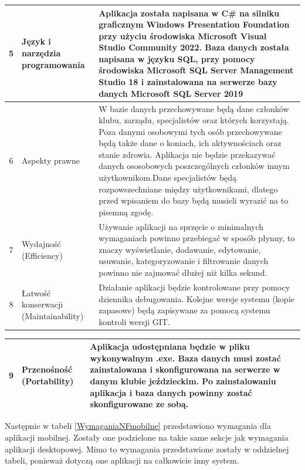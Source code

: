 \documentclass[12pt,oneside]{report}
\begin{document}
\begin{table}[H]
	\begin{tabular}{|c|p{6cm}|p{8cm}|}
		\hline
		5& Język i narzędzia programowania& Aplikacja została napisana w C\# na silniku graficznym Windows Presentation Foundation przy użyciu środowiska  Microsoft Visual Studio Community 2022.
		Baza danych została napisana w języku SQL, przy pomocy środowiska Microsoft SQL Server Management Studio 18 i zainstalowana na serwerze bazy danych Microsoft SQL Server 2019\\	

					\hline
		6& Aspekty prawne& W bazie danych przechowywane będą dane członków klubu, zarządu, specjalistów oraz których korzystają. Poza danymi osobowymi tych osób przechowywane będą także dane o koniach, ich aktywnościach oraz stanie zdrowia. Aplikacja nie będzie przekazywać danych ososobowych poszczególnych członków innym użytkownikom.Dane specjalistów będą rozpowszechniane między użytkownikami, dlatego przed wpisaniem do bazy będą musieli wyrazić na to pisemną zgodę.\\	
				\hline
		7& Wydajność (Efficiency)& Używanie aplikacji na sprzęcie o minimalnych wymaganiach powinno przebiegać w sposób płynny, to znaczy wyświetlanie, dodawanie, edytowanie, usuwanie, kategoryzowanie i filtrowanie danych powinno nie zajmować dłużej niż kilka sekund.\\	
		\hline
		8& Łatwość konserwacji (Maintainability)& Działanie aplikacji będzie kontrolowane przy pomocy dziennika debugowania. Kolejne wersje systemu (kopie zapasowe) będą zapisywane za pomocą systemu kontroli wersji GIT.\\	
								\hline
	\end{tabular}
\end{table}
\begin{table}[H]
	\begin{tabular}{|c|p{6cm}|p{8cm}|}
		\hline
		9& Przenośność (Portability)& Aplikacja udostępniana będzie w pliku wykonywalnym .exe. Baza danych musi zostać zainstalowana i skonfigurowana na serwerze w danym klubie jeździeckim. Po zainstalowaniu aplikacja i baza danych powinny zostać skonfigurowane ze sobą.\\
		\hline
	\end{tabular}
\end{table}
Następnie w tabeli \ref{WymaganiaNFmobilne} przedstawiono wymagania dla aplikacji mobilnej. Zostały one podzielone na takie same sekcje jak wymagania aplikacji desktopowej. Mimo to wymagania przedstawione zostały w oddzielnej tabeli, ponieważ dotyczą one aplikacji na całkowicie inny system.
\end{document}
